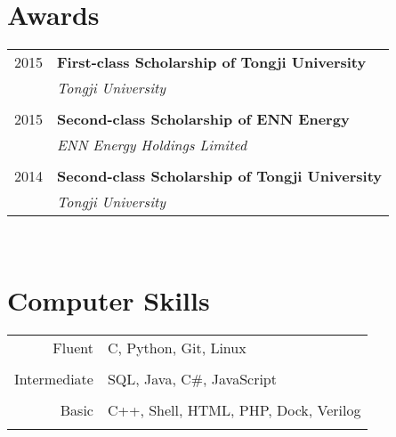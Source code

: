 \documentclass[10pt]{article} %
\begin{document}
{\begin{minipage}[t]{0.44\textwidth}

\section{Awards} 

\begin{tabular}{rl}
2015	 & \textbf{First-class Scholarship of Tongji University}\\
& \textit{Tongji University}\\ \\


2015	 & \textbf{Second-class Scholarship of ENN Energy}\\
& \textit{ENN Energy Holdings Limited}\\ \\


2014	 & \textbf{Second-class Scholarship of Tongji University}\\
& \textit{Tongji University}

\end{tabular}\\[10pt]







\section{Computer Skills} 

\begin{tabular}{rl}
Fluent
& C, Python, Git, Linux\\ 
& \\
Intermediate
& SQL, Java, C\#, JavaScript\\
& \\
Basic
& C++, Shell, HTML, PHP, Dock, Verilog\\
& \\
\end{tabular}


\end{minipage}}
\end{document}
